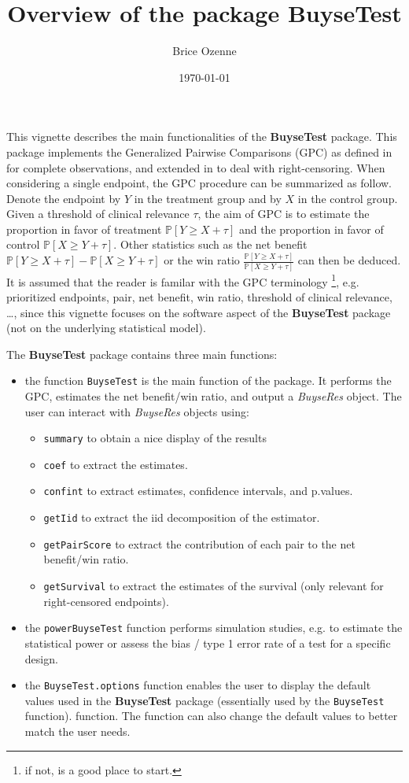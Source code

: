 \documentclass[12pt]{article}
\author{Brice Ozenne}
\date{\today}
\title{Overview of the package BuyseTest}
\newcommand\Prob{\mathbb{P}}
\begin{document}
\maketitle
This vignette describes the main functionalities of the \textbf{BuyseTest}
package. This package implements the Generalized Pairwise Comparisons
(GPC) as defined in \cite{buyse2010generalized} for complete
observations, and extended in \cite{peron2018extension} to deal with
right-censoring. When considering a single endpoint, the GPC procedure
can be summarized as follow. Denote the endpoint by \(Y\) in the
treatment group and by \(X\) in the control group. Given a
threshold of clinical relevance \(\tau\), the aim of GPC is to
estimate the proportion in favor of treatment \(\Prob[Y \geq X +
\tau]\) and the proportion in favor of control \(\Prob[X \geq Y +
\tau]\). Other statistics such as the net benefit \(\Prob[Y \geq X +
\tau]-\Prob[X \geq Y + \tau]\) or the win ratio \(\frac{\Prob[Y \geq
X + \tau]}{\Prob[X \geq Y + \tau]}\) can then be deduced. It is
assumed that the reader is familar with the GPC terminology \footnote{if
not, \cite{buyse2010generalized} is a good place to start.},
e.g. prioritized endpoints, pair, net benefit, win ratio, threshold of
clinical relevance, \ldots, since this vignette focuses on the
software aspect of the \textbf{BuyseTest} package (not on the underlying
statistical model).

\bigskip

The \textbf{BuyseTest} package contains three main functions:
\begin{itemize}
\item the function \texttt{BuyseTest} is the main function of the package. It
performs the GPC, estimates the net benefit/win ratio, and output a
\emph{BuyseRes} object. The user can interact with \emph{BuyseRes} objects using:
\begin{itemize}
\item \texttt{summary} to obtain a nice display of the results
\item \texttt{coef} to extract the estimates.
\item \texttt{confint} to extract estimates, confidence intervals, and p.values.
\item \texttt{getIid} to extract the iid decomposition of the estimator.
\item \texttt{getPairScore} to extract the contribution of each pair to the net benefit/win ratio.
\item \texttt{getSurvival} to extract the estimates of the survival (only relevant for right-censored endpoints).
\end{itemize}
\item the \texttt{powerBuyseTest} function performs simulation studies,
e.g. to estimate the statistical power or assess the bias / type 1
error rate of a test for a specific design.
\item the \texttt{BuyseTest.options} function enables the user to display the
default values used in the \textbf{BuyseTest} package (essentially used by
the \texttt{BuyseTest} function). function. The function can also change
the default values to better match the user needs.
\end{itemize}
\end{document}

